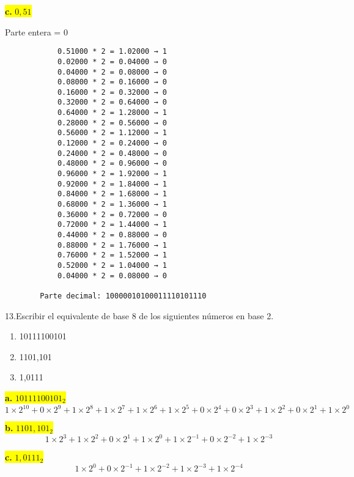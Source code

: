 \documentclass[a4paper,12pt]{article}
\begin{document}
	\begin{center}	
		\colorbox{yellow}{{\textbf{c.} $0,51$}} \\ \vspace{0.3cm}
		
		Parte entera = 0
		
		\begin{Verbatim}
			0.51000 * 2 = 1.02000 → 1 
			0.02000 * 2 = 0.04000 → 0 
			0.04000 * 2 = 0.08000 → 0 
			0.08000 * 2 = 0.16000 → 0 
			0.16000 * 2 = 0.32000 → 0 
			0.32000 * 2 = 0.64000 → 0 
			0.64000 * 2 = 1.28000 → 1 
			0.28000 * 2 = 0.56000 → 0 
			0.56000 * 2 = 1.12000 → 1 
			0.12000 * 2 = 0.24000 → 0 
			0.24000 * 2 = 0.48000 → 0 
			0.48000 * 2 = 0.96000 → 0 
			0.96000 * 2 = 1.92000 → 1 
			0.92000 * 2 = 1.84000 → 1 
			0.84000 * 2 = 1.68000 → 1 
			0.68000 * 2 = 1.36000 → 1 
			0.36000 * 2 = 0.72000 → 0 
			0.72000 * 2 = 1.44000 → 1 
			0.44000 * 2 = 0.88000 → 0 
			0.88000 * 2 = 1.76000 → 1 
			0.76000 * 2 = 1.52000 → 1 
			0.52000 * 2 = 1.04000 → 1 
			0.04000 * 2 = 0.08000 → 0
			
		Parte decimal: 10000010100011110101110
		\end{Verbatim}
	\end{center}
	
	13.Escribir el equivalente de base 8 de los siguientes números en base 2.
	\begin{enumerate}
		\item 10111100101 
		\item 1101,101
		\item 1,0111
	\end{enumerate}
	
	\begin{center}
	\colorbox{yellow}{{\textbf{a.} $10111100101_2$}} \\ 
	\[
	1\times2^{10} + 0\times2^{9} + 1\times2^{8} + 1\times2^{7} + 1\times2^{6} + 1\times2^{5} + 0\times2^{4} + 0\times2^{3} + 1\times2^{2} + 0\times2^{1} + 1\times2^{0}
	\]
	\end{center}
	
		\begin{center}
		\colorbox{yellow}{{\textbf{b.} $1101,101_2$}} \\ 
		\[
		1\times2^{3} + 1\times2^{2} + 0\times2^{1} + 1\times2^{0} + 1\times2^{-1} + 0\times2^{-2} + 1\times2^{-3}
		\]
	\end{center}
	
	\begin{center}
		\colorbox{yellow}{{\textbf{c.} $1,0111_2$}} \\ 
		\[
		1\times2^{0} + 0\times2^{-1} + 1\times2^{-2} + 1\times2^{-3} + 1\times2^{-4} 
		\]
	\end{center}
	
\end{document}
